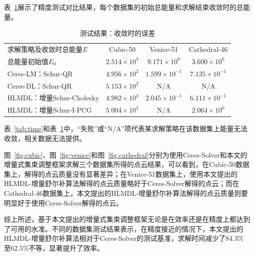 表~\ref{tab:energy}展示了精度测试对比结果，每个数据集的初始总能量和求解结束收敛时的总能量。

{
\linespread{1}
\begin{table}[htb!]
\caption{测试结果：收敛时的误差}
\label{tab:energy}
\centering
\begin{tabular}[b]{l|ccc}
    \toprule
    求解策略及收敛时总能量$E$ &          Cubic-50 &            Venice-51 &         Cathedral-46 \\
    总能量初始值$E_0$         & $2.514\times10^3$ &  $9.171\times10^{0}$ &  $3.600\times10^{0}$ \\ \midrule
    Ceres-LM：Schur-QR        & $4.956\times10^2$ & $1.599\times10^{-1}$ & $7.135\times10^{-1}$ \\
    Ceres-DL：Schur-QR        & $5.153\times10^2$ &                  N/A &                  N/A \\
    HLMDL：增量Schur-Cholesky & $4.982\times10^2$ & $2.045\times10^{-1}$ & $6.111\times10^{-1}$ \\
    HLMDL：增量Schur-I-PCG    & $5.004\times10^2$ &                  N/A &  $2.064\times10^{0}$ \\
    \bottomrule
\end{tabular}
\end{table}
}

表~\ref{tab:time}和表~\ref{tab:energy}中，“失败”或“N/A”项代表某求解策略在该数据集上能量无法收敛，相关数据无法提供。

图~\ref{fig:cubic}、图~\ref{fig:venice}和图~\ref{fig:cathedral}分别为使用Ceres-Solver和本文的增量式集束调整框架求解三个数据集所得的点云结果，可以看到，在Cubic-50数据集上，解得的点云质量没有显著差异；在Venice-51数据集上，使用本文提出的HLMDL-增量舒尔补算法解得的点云质量略好于Ceres-Solver解得的点云；而在Cathedral-46数据集上，本文提出的HLMDL-增量舒尔补算法解得的点云质量则要明显好于使用Ceres-Solver解得的点云。

综上所述，基于本文提出的增量式集束调整框架无论是在效率还是在精度上都达到了可用的水准。不同的数据集测试结果表示，在精度接近的情况下，本文提出的HLMDL-增量舒尔补算法相对于Ceres-Solver的测试基准，求解时间减少了$84.3\%$至$62.5\%$不等，显著提升了效率。

